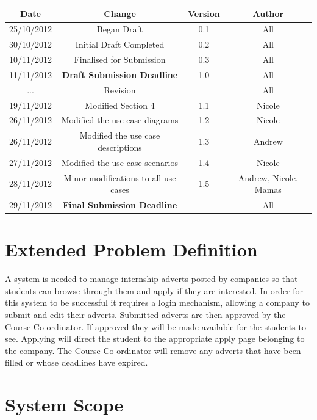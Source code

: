 \documentclass{l3deliverable}
\begin{document}
\begin{center}{
\begin{tabular}{|c|c|c|c|}
\hline \textbf{Date} &\textbf{ Change} & \textbf{Version} & \textbf{Author}\\ 
\hline 25/10/2012 & Began Draft & 0.1 & All \\ 
\hline 30/10/2012 & Initial Draft Completed & 0.2 & All \\ 
\hline 10/11/2012 & Finalised for Submission & 0.3 & All\\ 
\hline 11/11/2012 & \textbf{Draft Submission Deadline} & 1.0 & All\\ 
\hline ... & Revision & & All\\ 
\hline 19/11/2012 & Modified Section 4 & 1.1 & Nicole\\
\hline 26/11/2012 & Modified the use case diagrams & 1.2 & Nicole\\
\hline 26/11/2012 & Modified the use case descriptions & 1.3 & Andrew\\
\hline 27/11/2012 & Modified the use case scenarios & 1.4 & Nicole\\
\hline 28/11/2012 & Minor modifications to all use cases & 1.5 & Andrew, Nicole, Mamas\\
\hline 29/11/2012 & \textbf{Final Submission Deadline} & & All\\ 
\hline 
\end{tabular} }
\end{center}

\section{Extended Problem Definition}
A system is needed to manage internship adverts posted by companies so that students can browse
through them and apply if they are interested.
In order for this system to be successful it requires a login mechanism, allowing a company
to submit and edit their adverts. Submitted adverts are then approved by the Course
Co-ordinator. If approved they will be made available for the students to see.
Applying will direct the student to the appropriate apply page belonging to the company. 
The Course Co-ordinator will remove any adverts that have been filled or whose deadlines have expired.\\
\section{System Scope}
\end{document}
